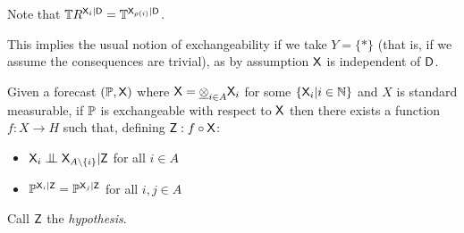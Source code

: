 Note that $\mathbb{T}R^{\mathsf{X}_i|\mathsf{D}} = \mathbb{T}^{\mathsf{X}_{\rho(i)}|\mathsf{D}}$.

This implies the usual notion of exchangeability if we take $Y=\{*\}$ (that is, if we assume the consequences are trivial), as by assumption $\mathsf{X}$ is independent of $\mathsf{D}$.

\begin{lemma}\label{lem:partial_representation}
Given a forecast $(\mathbb{P},\mathsf{X})$ where $\mathsf{X}=\underline{\otimes}_{i\in A} \mathsf{X}_i$ for some $\{\mathsf{X}_i|i\in \mathbb{N}\}$ and $X$ is standard measurable, if $\mathbb{P}$ is exchangeable with respect to $\mathsf{X}$ then there exists a function $f:X\to H$ such that, defining $\mathsf{Z}:f\circ \mathsf{X}$:
    \begin{itemize}
        \item $\RV{X}_i\CI\RV{X}_{A\setminus\{i\}}|\RV{Z}$ for all $i\in A$
        \item $\mathbb{P}^{\mathsf{X}_i|\mathsf{Z}}=\mathbb{P}^{\mathsf{X}_j|\mathsf{Z}}$ for all $i,j\in A$
    \end{itemize}
Call $\mathsf{Z}$ the \emph{hypothesis}.
\end{lemma}

